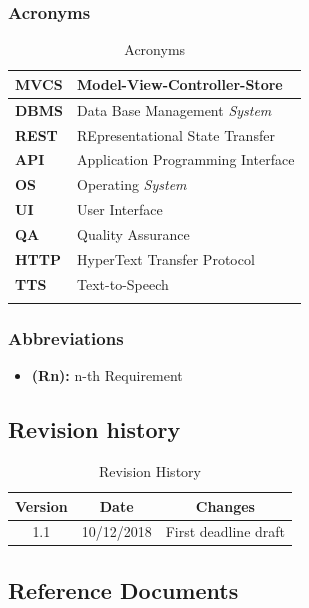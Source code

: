 \documentclass[titlepage]{article}
\begin{document}
	
	\subsubsection{Acronyms}
	
	\begin{longtable}{| p{2 cm} | p{7 cm} |} \hline
		{\bf MVCS} & Model-View-Controller-Store \\\hline
		{\bf DBMS} & Data Base Management {\it System} \\ \hline
		{\bf REST} & REpresentational State Transfer \\ \hline
		{\bf API} & Application Programming Interface \\ \hline
		{\bf OS} & Operating {\it System}\\ \hline
		{\bf UI} & User Interface \\ \hline
		{\bf QA} & Quality Assurance \\ \hline		
		{\bf HTTP} & HyperText Transfer Protocol \\ \hline	
		{\bf TTS} & Text-to-Speech \\ \hline
		\caption{Acronyms}	
						
	\end{longtable}

	\subsubsection{Abbreviations}
	
	\begin{itemize}
		\item {\bf (Rn):} n-th Requirement
	\end{itemize}
			
			
\subsection{Revision history}

\begin{table}[ht]
	\centering
	\begin{tabular}{ccc} 
		Version & Date & Changes  \\ 
		\hline
		1.1 & 10/12/2018 & First deadline draft \\
	\end{tabular}
	\caption{Revision History}
	\label{default}
\end{table}
	
	
\subsection{Reference Documents}
\end{document}
